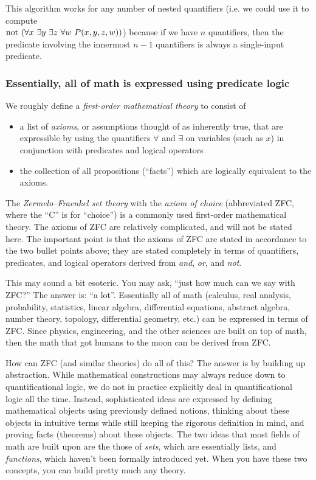 This algorithm works for any number of nested quantifiers (i.e. we could use it to compute \\ $\text{not }(\forall x \text{ } \exists y \text{ } \exists z \text{ } \forall w \text{ } P(x, y, z, w))$) because if we have $n$ quantifiers, then the predicate involving the innermost $n - 1$ quantifiers is always a single-input predicate.

\subsubsection{Essentially, all of math is expressed using predicate logic}

We roughly define a \textit{first-order mathematical theory} to consist of

\begin{itemize}
    \item a list of \textit{axioms}, or assumptions thought of as inherently true, that are expressible by using the quantifiers $\forall$ and $\exists$ on variables (such as $x$) in conjunction with predicates and logical operators
    \item the collection of all propositions (``facts'') which are logically equivalent to the axioms.
\end{itemize}

The \textit{Zermelo–Fraenkel set theory} with the \textit{axiom of choice} (abbreviated ZFC, where the ``C'' is for ``choice'') is a commonly used first-order mathematical theory. The axioms of ZFC are relatively complicated, and will not be stated here. The important point is that the axioms of ZFC are stated in accordance to the two bullet points above; they are stated completely in terms of quantifiers, predicates, and logical operators derived from \textit{and}, \textit{or}, and \textit{not}.

This may sound a bit esoteric. You may ask, ``just how much can we say with ZFC?'' The answer is: ``a lot''. Essentially all of math (calculus, real analysis, probability, statistics, linear algebra, differential equations, abstract algebra, number theory, topology, differential geometry, etc.) can be expressed in terms of ZFC. Since physics, engineering, and the other sciences are built on top of math, then the math that got humans to the moon can be derived from ZFC.

How can ZFC (and similar theories) do all of this? The answer is by building up abstraction. While mathematical constructions may always reduce down to quantificational logic, we do not in practice explicitly deal in quantificational logic all the time. Instead, sophisticated ideas are expressed by defining mathematical objects using previously defined notions, thinking about these objects in intuitive terms while still keeping the rigorous definition in mind, and proving facts (theorems) about these objects. The two ideas that most fields of math are built upon are the those of \textit{sets}, which are essentially lists, and \textit{functions}, which haven't been formally introduced yet. When you have these two concepts, you can build pretty much any theory.

